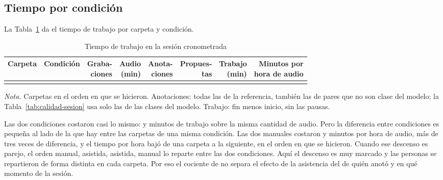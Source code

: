 \subsection{Tiempo por condición}

La Tabla~\ref{tab:sesion} da el tiempo de trabajo por carpeta y condición.

\begin{table}[htbp]
    \centering
    \small
    \begin{threeparttable}
        \caption{Tiempo de trabajo en la sesión cronometrada}
        \label{tab:sesion}
        \begin{tabular}{@{}llrrrrrr@{}}
            \toprule
            \textbf{Carpeta} & \textbf{Condición} & \thead{Graba-\\ciones} & \thead{Audio\\(min)} & \thead{Anota-\\ciones} & \thead{Propues-\\tas} & \thead{Trabajo\\(min)} & \thead{Minutos por\\hora de audio} \\
            \midrule
             \\
            \bottomrule
        \end{tabular}
        \begin{tablenotes}[flushleft]
            \footnotesize
            \item \textit{Nota.} Carpetas en el orden en que se hicieron.
            Anotaciones: todas las de la referencia, también las de pares que no
            son clase del modelo; la Tabla~\ref{tab:calidad-sesion} usa solo las
            \uSessionRef{} de las clases del modelo. Trabajo: fin menos inicio,
            sin las pausas.
        \end{tablenotes}
    \end{threeparttable}
\end{table}

Las dos condiciones costaron casi lo mismo: \uWorkManual{} y \uWorkAssisted{}
minutos de trabajo sobre la misma cantidad de audio. Pero la diferencia entre
condiciones es pequeña al lado de la que hay entre las carpetas de una misma
condición. Las dos manuales costaron \uFolderMinHigh{} y \uFolderMinLow{} minutos
por hora de audio, más de tres veces de diferencia, y el tiempo por hora bajó de
una carpeta a la siguiente, en el orden en que se hicieron. Cuando ese descenso es
parejo, el orden manual, asistida, asistida, manual lo reparte entre las dos
condiciones. Aquí el descenso es muy marcado y las personas se repartieron de
forma distinta en cada carpeta. Por eso el cociente de \uTimeRatio{} no separa el
efecto de la asistencia del de quién anotó y en qué momento de la sesión.

